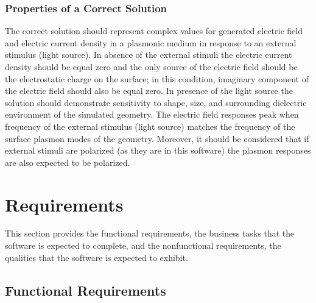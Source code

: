 \documentclass[12pt]{article}
\begin{document}
	\subsubsection{Properties of a Correct Solution} \label{sec_CorrectSolution}
	
	The correct solution should represent complex values for generated electric field and electric current density in a plasmonic medium in response to an external stimulus (light source). In absence of the external stimuli the electric current density should be equal zero and the only source of the electric field should be the electrostatic charge on the surface; in this condition, imaginary component of the electric field should also be equal zero. In presence of the light source the solution should demonstrate sensitivity to shape, size, and surrounding dielectric environment of the simulated geometry. The electric field responses peak when frequency of the external stimulus (light source) matches the frequency of the surface plasmon modes of the geometry. Moreover, it should be considered that if external stimuli are polarized (as they are in this software) the plasmon responses are also expected to be polarized. 

	
	
	
	\section{Requirements}
	\label{req}
	
	This section provides the functional requirements, the business tasks that the
	software is expected to complete, and the nonfunctional requirements, the
	qualities that the software is expected to exhibit.
	
	\subsection{Functional Requirements}
	
\end{document}
